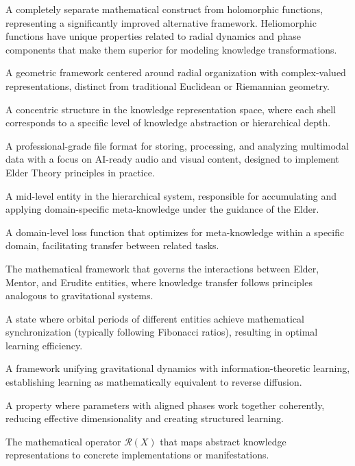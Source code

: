 \begin{description}[leftmargin=2cm, style=nextline]
    \item[Heliomorphic Function] A completely separate mathematical construct from holomorphic functions, representing a significantly improved alternative framework. Heliomorphic functions have unique properties related to radial dynamics and phase components that make them superior for modeling knowledge transformations.
    
    \item[Heliomorphic Geometry] A geometric framework centered around radial organization with complex-valued representations, distinct from traditional Euclidean or Riemannian geometry.
    
    \item[Heliomorphic Shell] A concentric structure in the knowledge representation space, where each shell corresponds to a specific level of knowledge abstraction or hierarchical depth.
    
    \item[MAGE File] A professional-grade file format for storing, processing, and analyzing multimodal data with a focus on AI-ready audio and visual content, designed to implement Elder Theory principles in practice.
    
    \item[Mentor] A mid-level entity in the hierarchical system, responsible for accumulating and applying domain-specific meta-knowledge under the guidance of the Elder.
    
    \item[Mentor Loss] A domain-level loss function that optimizes for meta-knowledge within a specific domain, facilitating transfer between related tasks.
    
    \item[Orbital Mechanics] The mathematical framework that governs the interactions between Elder, Mentor, and Erudite entities, where knowledge transfer follows principles analogous to gravitational systems.
    
    \item[Orbital Resonance] A state where orbital periods of different entities achieve mathematical synchronization (typically following Fibonacci ratios), resulting in optimal learning efficiency.
    
    \item[Orbital Thermodynamics] A framework unifying gravitational dynamics with information-theoretic learning, establishing learning as mathematically equivalent to reverse diffusion.
    
    \item[Phase Coherence] A property where parameters with aligned phases work together coherently, reducing effective dimensionality and creating structured learning.
    
    \item[Realization] The mathematical operator $\mathcal{R}(X)$ that maps abstract knowledge representations to concrete implementations or manifestations.
\end{description}